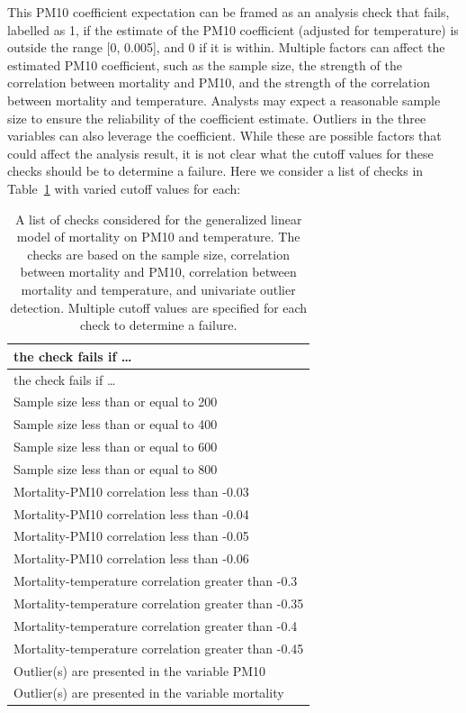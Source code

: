 \documentclass[
  12pt,
]{interact}
\begin{document}
This PM10 coefficient expectation can be framed as an analysis check
that fails, labelled as 1, if the estimate of the PM10 coefficient
(adjusted for temperature) is outside the range {[}0, 0.005{]}, and 0 if
it is within. Multiple factors can affect the estimated PM10
coefficient, such as the sample size, the strength of the correlation
between mortality and PM10, and the strength of the correlation between
mortality and temperature. Analysts may expect a reasonable sample size
to ensure the reliability of the coefficient estimate. Outliers in the
three variables can also leverage the coefficient. While these are
possible factors that could affect the analysis result, it is not clear
what the cutoff values for these checks should be to determine a
failure. Here we consider a list of checks in Table~\ref{tbl-checks}
with varied cutoff values for each:

\begin{longtable}[]{@{}l@{}}
\caption{A list of checks considered for the generalized linear model of
mortality on PM10 and temperature. The checks are based on the sample
size, correlation between mortality and PM10, correlation between
mortality and temperature, and univariate outlier detection. Multiple
cutoff values are specified for each check to determine a
failure.}\label{tbl-checks}\tabularnewline
\toprule\noalign{}
the check fails if \ldots{} \\
\midrule\noalign{}
\endfirsthead
\toprule\noalign{}
the check fails if \ldots{} \\
\midrule\noalign{}
\endhead
\bottomrule\noalign{}
\endlastfoot
Sample size less than or equal to 200 \\
Sample size less than or equal to 400 \\
Sample size less than or equal to 600 \\
Sample size less than or equal to 800 \\
Mortality-PM10 correlation less than -0.03 \\
Mortality-PM10 correlation less than -0.04 \\
Mortality-PM10 correlation less than -0.05 \\
Mortality-PM10 correlation less than -0.06 \\
Mortality-temperature correlation greater than -0.3 \\
Mortality-temperature correlation greater than -0.35 \\
Mortality-temperature correlation greater than -0.4 \\
Mortality-temperature correlation greater than -0.45 \\
Outlier(s) are presented in the variable PM10 \\
Outlier(s) are presented in the variable mortality \\
\end{longtable}
\end{document}
